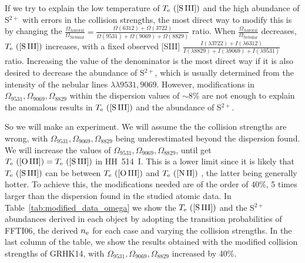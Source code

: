 \documentclass[fleqn,usenatbib]{mnras}
\begin{document}
If we try to explain the low temperature of $T_{\rm e} \text{ ([S\thinspace III])}$ and the high abundance of S$^{2+}$ with errors in the collision strengths, the most direct way to modify this is by changing the  $\frac{\Omega_{\text{Auroral}}}{\Omega_{\text{Nebular}}}=\frac{\Omega(6312)+\Omega(3722)}{\Omega(9531)+\Omega(9069)+\Omega(8829)}$ ratio. When $\frac{\Omega_{\text{Auroral}}}{\Omega_{\text{Nebular}}}$ decreases, $T_{\rm e} \text{ ([S\thinspace III])}$ increases, with a fixed observed [S\thinspace III] $\frac{I(\lambda3722)+I(\lambda6312)}{I(\lambda 8829)+I(\lambda9069)+I(\lambda9531)}$ ratio. Increasing the value of the denominator is the most direct way if it is also desired to decrease the abundance of S$^{2+}$, which is usually determined from the intensity of the nebular lines $\lambda \lambda 9531, 9069$. However, modifications in $\Omega_{9531}, \Omega_{9069}, \Omega_{8829}$ within the dispersion values of $\sim8$\% are not enough to explain the anomalous results in $T_{\rm e} \text{ ([S\thinspace III])}$ and the abundance of S$^{2+}$.

So we will make an experiment. We will assume the the collision strengths are wrong, with $\Omega_{9531}, \Omega_{9069}, \Omega_{8829}$ being underestimated beyond the dispersion found. We will increase the values of $\Omega_{9531}, \Omega_{9069}, \Omega_{8829}$, until get $T_{\rm e} \text{ ([O\thinspace III])}=T_{\rm e} \text{ ([S\thinspace III])} $ in HH~514~I. This is a lower limit since it is likely that $T_{\rm e} \text{ ([S\thinspace III])} $ can be between $T_{\rm e} \text{ ([O\thinspace III])} $ and $T_{\rm e} \text{ ([N\thinspace II])} $ \citep[][]{Berg20}, the latter being generally hotter. To achieve this, the modifications needed are of the order of 40\%, 5 times larger than the dispersion found in the studied atomic data. In Table~\ref{tab:modified_data_omega} we show the $T_{\rm e} \text{ ([S\thinspace III])} $ and the S$^{2+}$ abundances derived in each object by adopting the transition probabilities of FFTI06, the derived $n_{\rm e}$ for each case and varying the collision strengths. In the last column of the table, we show the results obtained with the modified collision strengths of GRHK14, with $\Omega_{9531}, \Omega_{9069}, \Omega_{8829}$ increased by 40\%. 
\end{document}
